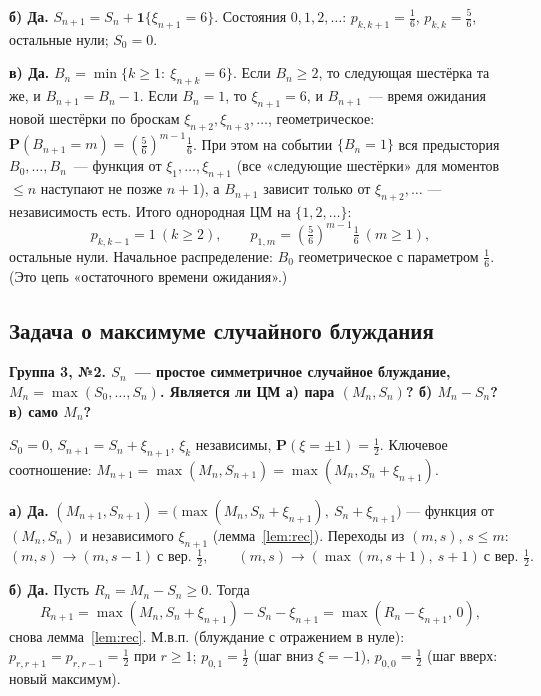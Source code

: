 \documentclass[11pt,a4paper]{article}
\theoremstyle{definition}
\newcommand{\PP}{\mathbf P}
\newcommand{\1}{\mathbf 1}
\newenvironment{task}[1]{\par\medskip\noindent\colorbox{black!7}{\parbox{\dimexpr\linewidth-2\fboxsep}{\textbf{#1}}}\par\smallskip}{\par}
\begin{document}
\textbf{б) Да.} $S_{n+1}=S_n+\1\{\xi_{n+1}=6\}$. Состояния $0,1,2,\dots$:
$p_{k,k+1}=\frac16$, $p_{k,k}=\frac56$, остальные нули; $S_0=0$.

\textbf{в) Да.} $B_n=\min\{k\ge1:\ \xi_{n+k}=6\}$. Если $B_n\ge2$, то
следующая шестёрка та же, и $B_{n+1}=B_n-1$. Если $B_n=1$, то $\xi_{n+1}=6$, и
$B_{n+1}$~--- время ожидания новой шестёрки по броскам $\xi_{n+2},\xi_{n+3},\dots$,
геометрическое: $\PP(B_{n+1}=m)=\left(\frac56\right)^{m-1}\frac16$.
При этом на событии $\{B_n=1\}$ вся предыстория $B_0,\dots,B_n$~--- функция от
$\xi_1,\dots,\xi_{n+1}$ (все «следующие шестёрки» для моментов $\le n$
наступают не позже $n+1$), а $B_{n+1}$ зависит только от $\xi_{n+2},\dots$ ---
независимость есть. Итого однородная ЦМ на $\{1,2,\dots\}$:
\[
p_{k,k-1}=1\ (k\ge2),\qquad p_{1,m}=\left(\tfrac56\right)^{m-1}\tfrac16\ (m\ge1),
\]
остальные нули. Начальное распределение: $B_0$ геометрическое с параметром
$\frac16$. (Это цепь «остаточного времени ожидания».)

\subsection{Задача о максимуме случайного блуждания}\label{z:walk}

\begin{task}{Группа 3, №2. $S_n$~--- простое симметричное случайное блуждание,
$M_n=\max(S_0,\dots,S_n)$. Является ли ЦМ а) пара $(M_n,S_n)$? б) $M_n-S_n$?
в) само $M_n$?}
\end{task}
$S_0=0$, $S_{n+1}=S_n+\xi_{n+1}$, $\xi_k$ независимы,
$\PP(\xi=\pm1)=\frac12$. Ключевое соотношение:
$M_{n+1}=\max(M_n,S_{n+1})=\max(M_n,S_n+\xi_{n+1})$.

\textbf{а) Да.} $(M_{n+1},S_{n+1})=\bigl(\max(M_n,S_n+\xi_{n+1}),\ S_n+\xi_{n+1}\bigr)$
--- функция от $(M_n,S_n)$ и независимого $\xi_{n+1}$ (лемма~\ref{lem:rec}).
Переходы из $(m,s)$, $s\le m$:
\[
(m,s)\to(m,s-1)\ \text{с вер. }\tfrac12,\qquad
(m,s)\to(\max(m,s+1),\ s+1)\ \text{с вер. }\tfrac12 .
\]

\textbf{б) Да.} Пусть $R_n=M_n-S_n\ge0$. Тогда
\[
R_{n+1}=\max(M_n,S_n+\xi_{n+1})-S_n-\xi_{n+1}=\max(R_n-\xi_{n+1},\,0),
\]
снова лемма~\ref{lem:rec}. М.в.п. (блуждание с отражением в нуле):
$p_{r,r+1}=p_{r,r-1}=\frac12$ при $r\ge1$; $p_{0,1}=\frac12$ (шаг вниз
$\xi=-1$), $p_{0,0}=\frac12$ (шаг вверх: новый максимум).
\end{document}
